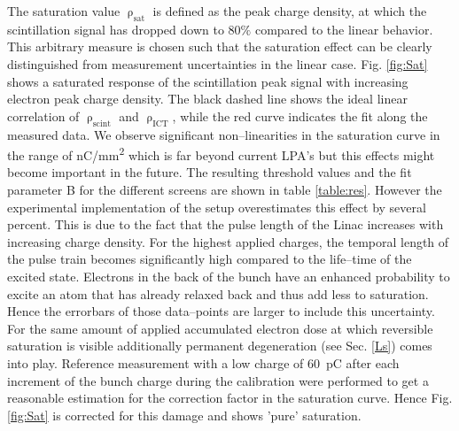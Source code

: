 \documentclass[%
preprint,
amsmath,
amssymb,
aip,
rsi, 
numerical,
floatfix,
]{revtex4-1}
\begin{document}
The saturation value $\uprho_{\text{sat}}$ is defined as the peak charge density, at which the scintillation signal has dropped down to 80$\%$ compared to the linear behavior.
This arbitrary measure is chosen such that the saturation effect can be clearly distinguished from measurement uncertainties in the linear case. 
Fig. \ref{fig:Sat} shows a saturated response of the scintillation peak signal with increasing electron peak charge density. 
The black dashed line shows the ideal linear correlation of $\uprho_{\text{scint}}$ and $\uprho_{\text{ICT}}$, while the red curve indicates the fit along the measured data. 
We observe significant non--linearities in the saturation curve in the range of \si[per-mode=symbol]{\nano\coulomb \per \square\milli\meter} which is far beyond current LPA's but this effects might become important in the future. 
The resulting threshold values and the fit parameter B for the different screens are shown in table \ref{table:res}.
However the experimental implementation of the setup overestimates this effect by several percent. 
This is due to the fact that the pulse length of the Linac increases with increasing charge density.
For the highest applied charges, the temporal length of the pulse train becomes significantly high compared to the life--time of the excited state.
Electrons in the back of the bunch have an enhanced probability to excite an atom that has already relaxed back and thus add less to saturation.
Hence the errorbars of those data--points are larger to include this uncertainty.
For the same amount of applied accumulated electron dose at which reversible saturation is visible additionally permanent degeneration (see Sec. \ref{Ls}) comes into play.
Reference measurement with a low charge of \SI{60}{\pico\coulomb} after each increment of the bunch charge during the calibration were performed to get a reasonable estimation for the correction factor in the saturation curve.
Hence Fig. \ref{fig:Sat} is corrected for this damage and shows 'pure' saturation.      
\end{document}
